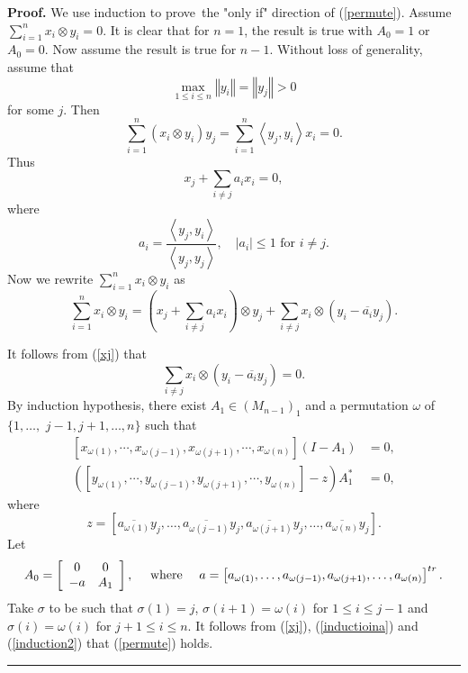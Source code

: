 \documentclass{article}%
\newenvironment{proof}[1][Proof]{\noindent\textbf{#1.} }{\ \rule{0.5em}{0.5em}}
\begin{document}
\begin{proof}
We use induction to prove\ the "only if" direction of (\ref{permute}). Assume
$\sum_{i=1}^{n}x_{i}\otimes y_{i}=0.$ It is clear that for $n=1$, the result
is true with $A_{0}=1$ or $A_{0}=0$. Now assume the result is true for $n-1$.
Without loss of generality, assume that
\[
\max_{1\leq i\leq n}\left\Vert y_{i}\right\Vert =\left\Vert y_{j}\right\Vert
>0
\]
for some $j$. Then
\[
\sum_{i=1}^{n}\left(  x_{i}\otimes y_{i}\right)  y_{j} =\sum_{i=1}%
^{n}\left\langle y_{j},y_{i}\right\rangle x_{i} =0.
\]
Thus
\begin{equation}
x_{j}+\sum_{i\neq j}a_{i}x_{i}=0, \label{xj}%
\end{equation}
where
\[
a_{i}=\frac{\left\langle y_{j},y_{i}\right\rangle }{\left\langle y_{j}%
,y_{j}\right\rangle },\quad\left\vert a_{i}\right\vert \leq1\text{ for }i\neq
j.
\]
Now we rewrite $\sum_{i=1}^{n}x_{i}\otimes y_{i}$ as%
\[
\sum_{i=1}^{n}x_{i}\otimes y_{i}=\left(  x_{j}+\sum_{i\neq j}a_{i}%
x_{i}\right)  \otimes y_{j}+\sum_{i\neq j}x_{i}\otimes\left(  y_{i}%
-\overline{a_{i}}y_{j}\right)  .
\]


It follows from (\ref{xj}) that%
\[
\sum_{i\neq j}x_{i}\otimes\left(  y_{i}-\overline{a_{i}}y_{j}\right)  =0.
\]
By induction hypothesis, there exist $A_{1}\in\left(  M_{n-1}\right)  _{1}$
and a permutation $\omega$ of $\{1,\ldots,$ $j-1,j+1,\ldots,n\}$ such that
\begin{align}
\left[  x_{\omega(1)},\cdots,x_{\omega(j-1)},x_{\omega(j+1)},\cdots
,x_{\omega(n)}\right]  (I-A_{1})  &  =0,\label{inductioina}\\
\left(  \left[  y_{\omega(1)},\cdots,y_{\omega(j-1)},y_{\omega(j+1)}%
,\cdots,y_{\omega(n)}\right]  -z\right)  A_{1}^{\ast}  &  =0,
\label{induction2}%
\end{align}
where%
\[
z=\left[  \overline{a_{\omega(1)}}y_{j},\ldots,\overline{a_{\omega(j-1)}}%
y_{j},\overline{a_{\omega(j+1)}}y_{j},\ldots,\overline{a_{\omega(n)}}%
y_{j}\right]  .
\]
Let
\[
A_{0}=\left[
\begin{array}
[c]{cc}%
0 & 0\\
-a & A_{1}%
\end{array}
\right]  ,\quad\text{ where }\quad a=\left[  a_{\omega(1)},\ldots
,a_{\omega(j-1)},a_{\omega(j+1)},\ldots,a_{\omega(n)}\right]  ^{tr}.
\]
Take $\sigma$ to be such that $\sigma(1)=j$, $\sigma(i+1)=\omega(i)$ for
$1\leq i\leq j-1$ and $\sigma(i)=\omega(i)$ for $j+1\leq i\leq n$. It follows
from (\ref{xj}), (\ref{inductioina}) and (\ref{induction2}) that
(\ref{permute}) holds.
\end{proof}
\end{document}
